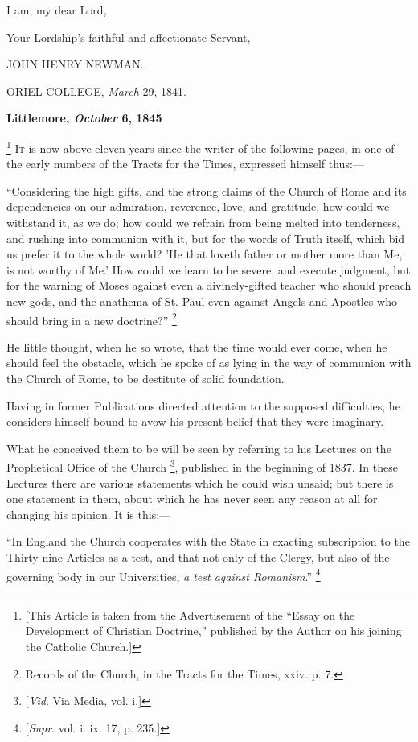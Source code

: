 I am, my dear Lord,

Your Lordship's faithful and affectionate Servant,

JOHN HENRY
NEWMAN.

ORIEL COLLEGE,
\emph{March} 29, 1841.


\textbf{Littlemore, \emph{October} 6, 1845}

\footnote{[This Article is taken from the Advertisement of the ``Essay
on the Development of Christian Doctrine,'' published by the
Author on his joining the Catholic Church.]} I\textsc{t} is now above
eleven years since the writer of the following pages, in one of the
early numbers of the Tracts for the Times, expressed himself thus:—

``Considering the high gifts, and the strong
claims of the Church of Rome and its dependencies on our admiration,
reverence, love, and gratitude, how could we withstand it, as we do;
how could we refrain from being melted into tenderness, and rushing
into communion with it, but for the words of Truth itself, which bid
us prefer it to the whole world? 'He that loveth father or mother more
than Me, is not worthy of Me.' How could we learn to be severe, and
execute judgment, but for the warning of Moses against even a
divinely-gifted teacher who should preach new gods, and the anathema
of St. Paul even against Angels and Apostles who should bring in a new
doctrine?'' \footnote{Records of the Church, in the Tracts for the
Times, xxiv. p. 7.}

He little thought, when he so wrote, that the time would ever come,
when he should feel the obstacle, which he spoke of as lying in the
way of communion with the Church of Rome, to be destitute of solid
foundation.

Having in former Publications directed attention to the supposed
difficulties, he considers himself bound to avow his present belief
that they were imaginary.

What he conceived them to be will be seen by referring to his
Lectures on the Prophetical Office of the Church \footnote{[\emph{Vid}. Via
Media, vol. i.]}, published in the beginning of 1837. In these Lectures there
are various statements which he could wish unsaid; but there is one
statement in them, about which he has never seen any reason at all for
changing his opinion. It is this:—

``In England the Church cooperates with the
State in exacting subscription to the Thirty-nine Articles as a test,
and that not only of the Clergy, but also of the governing body in our
Universities, \emph{a test against Romanism}.'' \footnote{[\emph{Supr}. vol. i. ix. 17, p. 235.]}

